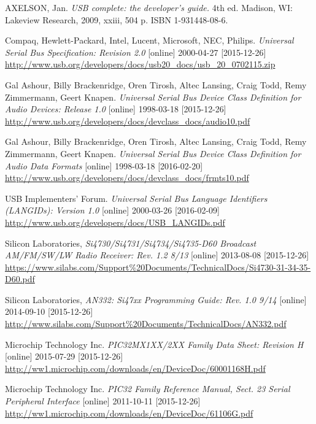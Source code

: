 \documentclass[bc,male,c,dept460]{diploma}						%
\begin{document}
\begin{thebibliography}{99}


 AXELSON, Jan. 
\textit{USB complete: the developer's guide.} 4th ed. Madison, WI: Lakeview Research, 2009, xxiii, 504 p. ISBN 1-931448-08-6.

 Compaq, Hewlett-Packard, Intel, Lucent, Microsoft, NEC, Philips. 
\textit{Universal Serial Bus Specification: Revision 2.0} [online] 2000-04-27 [2015-12-26]
\url{http://www.usb.org/developers/docs/usb20_docs/usb_20_0702115.zip}

 Gal Ashour, Billy Brackenridge, Oren Tirosh, Altec Lansing, Craig Todd, Remy Zimmermann, Geert Knapen. 
\textit{Universal Serial Bus Device Class Definition for Audio Devices: Release 1.0} [online] 1998-03-18 [2015-12-26]
\url{http://www.usb.org/developers/docs/devclass_docs/audio10.pdf}

 Gal Ashour, Billy Brackenridge, Oren Tirosh, Altec Lansing, Craig Todd, Remy Zimmermann, Geert Knapen. 
\textit{Universal Serial Bus Device Class Definition for Audio Data Formats} [online] 1998-03-18 [2016-02-20]
\url{http://www.usb.org/developers/docs/devclass_docs/frmts10.pdf}

  USB Implementers’ Forum. 
\textit{Universal Serial Bus Language Identifiers (LANGIDs): Version 1.0} [online] 2000-03-26 [2016-02-09]
\url{http://www.usb.org/developers/docs/USB_LANGIDs.pdf}

 Silicon Laboratories,
\textit{Si4730/Si4731/Si4734/Si4735-D60 Broadcast AM/FM/SW/LW Radio Receiver: Rev. 1.2 8/13} [online] 2013-08-08 [2015-12-26] \url{https://www.silabs.com/Support\%20Documents/TechnicalDocs/Si4730-31-34-35-D60.pdf}

 Silicon Laboratories,
\textit{AN332: Si47xx Programming Guide: Rev. 1.0 9/14 } [online] 2014-09-10 [2015-12-26] \url{http://www.silabs.com/Support\%20Documents/TechnicalDocs/AN332.pdf}

 Microchip Technology Inc.
\textit{PIC32MX1XX/2XX Family Data Sheet: Revision H} [online] 2015-07-29 [2015-12-26]
\url{http://ww1.microchip.com/downloads/en/DeviceDoc/60001168H.pdf}

 Microchip Technology Inc.
\textit{PIC32 Family Reference Manual, Sect. 23 Serial Peripheral Interface} [online] 2011-10-11 [2015-12-26]
\url{http://ww1.microchip.com/downloads/en/DeviceDoc/61106G.pdf}


\end{thebibliography}
\end{document}
